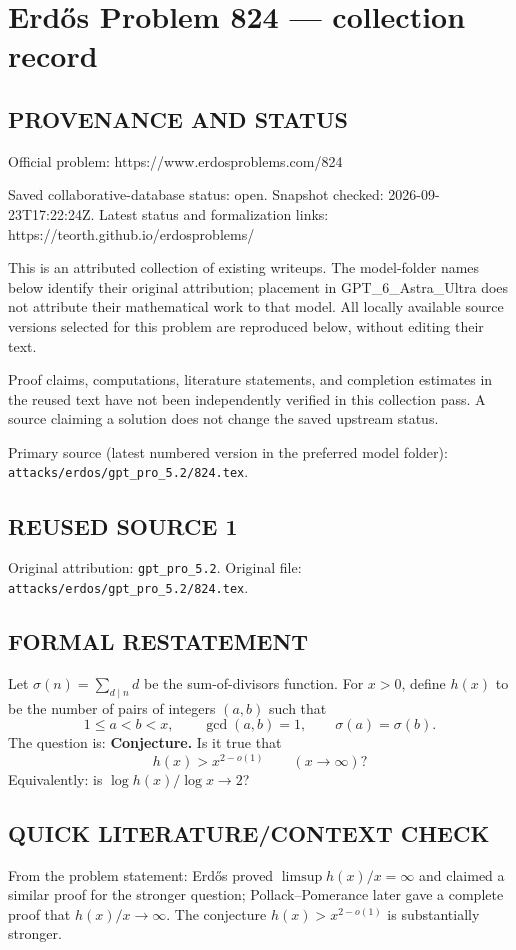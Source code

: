 \section*{Erd\H{o}s Problem 824 --- collection record}

\subsection*{PROVENANCE AND STATUS}
Official problem: https://www.erdosproblems.com/824

Saved collaborative-database status: open.
Snapshot checked: 2026-09-23T17:22:24Z.
Latest status and formalization links: https://teorth.github.io/erdosproblems/

This is an attributed collection of existing writeups. The model-folder names below identify their original attribution; placement in GPT\_6\_Astra\_Ultra does not attribute their mathematical work to that model. All locally available source versions selected for this problem are reproduced below, without editing their text.

Proof claims, computations, literature statements, and completion estimates in the reused text have not been independently verified in this collection pass. A source claiming a solution does not change the saved upstream status.

Primary source (latest numbered version in the preferred model folder): \texttt{attacks/erdos/gpt\_pro\_5.2/824.tex}.

\subsection*{REUSED SOURCE 1}
Original attribution: \texttt{gpt\_pro\_5.2}.
Original file: \texttt{attacks/erdos/gpt\_pro\_5.2/824.tex}.


\subsection*{FORMAL RESTATEMENT}
Let $\sigma(n)=\sum_{d\mid n} d$ be the sum-of-divisors function. For $x>0$, define $h(x)$ to be the number of pairs of integers $(a,b)$ such that
\[
1\le a<b<x,\qquad \gcd(a,b)=1,\qquad \sigma(a)=\sigma(b).
\]
The question is:
\medskip
\noindent\textbf{Conjecture.} Is it true that
\[
 h(x) > x^{2-o(1)}\qquad (x\to\infty)?
\]
Equivalently: is $\log h(x) / \log x \to 2$?

\subsection*{QUICK LITERATURE/CONTEXT CHECK}
From the problem statement: Erd\H{o}s proved $\limsup h(x)/x=\infty$ and claimed a similar proof for the stronger question; Pollack--Pomerance later gave a complete proof that $h(x)/x\to\infty$. The conjecture $h(x)>x^{2-o(1)}$ is substantially stronger.

